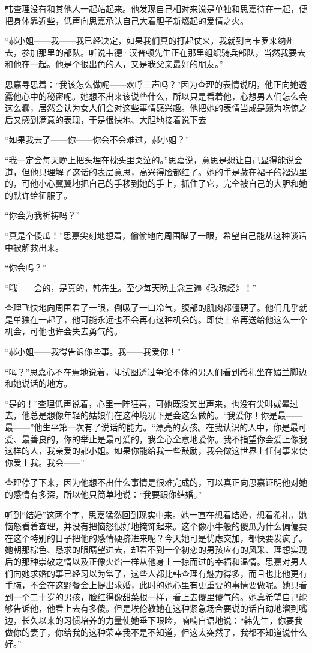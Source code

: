 \par 韩查理没有和其他人一起站起来。他发现自己相对来说是单独和思嘉待在一起，便把身体靠近些，低声向思嘉承认自己大着胆子新燃起的爱情之火。
\par “郝小姐——我——我已经决定，如果我们真的打起仗来，我就到南卡罗来纳州去，参加那里的部队。听说韦德·汉普顿先生正在那里组织骑兵部队，当然我要去和他在一起。他是个很出色的人，又是我父亲最好的朋友。”
\par 思嘉寻思着：“我该怎么做呢——欢呼三声吗？”因为查理的表情说明，他正向她透露他心中的秘密呢。她想不出来该说些什么，所以只是看着他，心想男人们怎么会这么蠢，居然会认为女人们会对这些事情感兴趣。他把她的表情当成是颇为吃惊之后又感到满意的表现，于是很快地、大胆地接着说下去——
\par “如果我去了——你——你会不会难过，郝小姐？”
\par “我一定会每天晚上把头埋在枕头里哭泣的。”思嘉说，意思是想让自己显得能说会道，但他只理解了这话的表层意思，高兴得脸都红了。她的手是藏在裙子的褶边里的，可他小心翼翼地把自己的手移到她的手上，抓住了它，完全被自己的大胆和她的默许给征服了。
\par “你会为我祈祷吗？”
\par “真是个傻瓜！”思嘉尖刻地想着，偷偷地向周围瞄了一眼，希望自己能从这种谈话中被解救出来。
\par “你会吗？”
\par “哦——会的，是真的，韩先生。至少每天晚上念三遍《玫瑰经》！”
\par 查理飞快地向周围看了一眼，倒吸了一口冷气，腹部的肌肉都僵硬了。他们几乎就是单独在一起了，他可能永远也不会再有这种机会的。即使上帝再送给他这么一个机会，可他也许会失去勇气的。
\par “郝小姐——我得告诉你些事。我——我爱你！”
\par “呣？”思嘉心不在焉地说着，却试图透过争论不休的男人们看到希礼坐在媚兰脚边和她说话的地方。
\par “是的！”查理低声说着，心里一阵狂喜，可她既没笑出声来，也没有尖叫或晕过去，他总是想像年轻的姑娘们在这种境况下是会这么做的。“我爱你！你是最——最——”他生平第一次有了说话的能力。“漂亮的女孩。在我认识的人中，你是最可爱、最善良的，你的举止是最可爱的，我全心全意地爱你。我不指望你会爱上像我这样的人，我亲爱的郝小姐。如果你能给我一些鼓励，我会做这世界上任何事来使你爱上我。我会——”
\par 查理停了下来，因为他想不出什么事情是很难完成的，可以真正向思嘉证明他对她的感情有多深，所以他只简单地说：“我要跟你结婚。”
\par 听到“结婚”这两个字，思嘉猛然回到现实中来。她一直在想着结婚，想着希礼，她恼怒看着查理，并没有把恼怒很好地掩饰起来。这个像小牛般的傻瓜为什么偏偏要在这个特别的日子把他的感情硬挤进来呢？今天她可是忧虑交加，都快要发疯了。她朝那棕色、恳求的眼睛望进去，却看不到一个初恋的男孩应有的风采、理想实现后的那种崇敬之情以及正像火焰一样从他身上一掠而过的幸福和温情。思嘉对男人们向她求婚的事已经习以为常了，这些人都比韩查理有魅力得多，而且也比他更有手腕，不会在这野餐会上提出求婚，此时的她心里有更重要的事情要做呢。她只看到一个二十岁的男孩，脸红得像甜菜根一样，看上去傻里傻气的。她真希望自己能够告诉他，他看上去有多傻。但是埃伦教她在这种紧急场合要说的话自动地溜到嘴边，长久以来的习惯培养的力量使她垂下眼睑，喃喃自语地说：“韩先生，你要我做你的妻子，你给我的这种荣幸我不是不知道，但这太突然了，我都不知道说什么好。”
